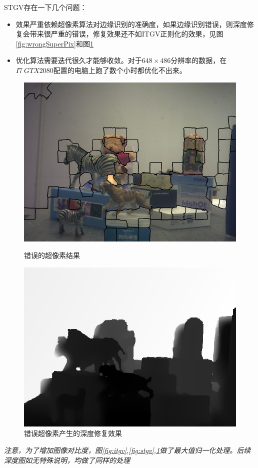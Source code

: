 \documentclass[UTF8]{ctexart}
\begin{document}
\begin{sloppypar}
    STGV存在一下几个问题：
    \begin{itemize}
        \item [1)]
        效果严重依赖超像素算法对边缘识别的准确度，如果边缘识别错误，则深度修复会带来很严重的错误，修复效果还不如ITGV正则化的效果，见图\ref{fig:wrongSuperPix}和图\ref{fig:wrongspDepInpaint}
        \item [2)]
        优化算法需要迭代很久才能够收敛。对于$648\times486$分辨率的数据，在$I7\ GTX2080$配置的电脑上跑了数个小时都优化不出来。
    \end{itemize}
    \begin{figure}[htbp]
        \begin{minipage}[t]{0.5\linewidth}
            \centering
            \includegraphics[width=0.9\linewidth]{figure/wrongseg}
            \caption{\small 错误的超像素结果}
            \label{fig:wrongSuperPix}
        \end{minipage}
        \begin{minipage}[t]{0.5\linewidth}
            \centering
            \includegraphics[width=0.9\linewidth]{figure/iter14740_wrongseg}
            \caption{\small 错误超像素产生的深度修复效果}
            \label{fig:wrongspDepInpaint}
        \end{minipage}
    \end{figure}
    \emph{注意，为了增加图像对比度，图\ref{fig:itgv},\ref{fig:stgv},\ref{fig:wrongspDepInpaint}做了最大值归一化处理。后续深度图如无特殊说明，均做了同样的处理}

\end{sloppypar}
\end{document}
